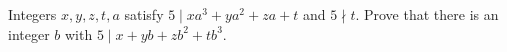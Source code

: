 Integers $x,y,z,t,a$ satisfy $5\mid xa^3+ya^2+za+t$ and $5\nmid t$. Prove that there is an integer $b$ with $5\mid x+yb+zb^2+tb^3$.
